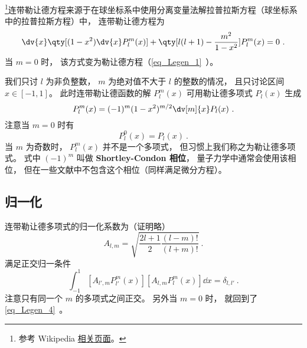 

\footnote{参考 Wikipedia \href{https://en.wikipedia.org/wiki/Associated_Legendre_polynomials}{相关页面}。}连带勒让德方程来源于在球坐标系中使用分离变量法解拉普拉斯方程（球坐标系中的拉普拉斯方程）中， 连带勒让德方程为
\begin{equation}
\dv{x} \qty[(1-x^2)\dv{x} P_l^m(x)] + \qty[l(l+1) - \frac{m^2}{1-x^2}]P_l^m(x) = 0~.
\end{equation}
当 $m = 0$ 时， 该方式变为勒让德方程（\autoref{eq_Legen_1}~）。

我们只讨 $l$ 为非负整数， $m$ 为绝对值不大于 $l$ 的整数的情况， 且只讨论区间 $x\in [-1,1]$。 此时连带勒让德函数的解 $P_l^m(x)$ 可用勒让德多项式 $P_l(x)$ 生成
\begin{equation}\label{eq_AsLgdr_1}
P_l^m(x) = (-1)^m (1 - x^2)^{m/2} \dv[m]{x} P_l(x)~.
\end{equation}
注意当 $m = 0$ 时有
\begin{equation}
P_l^0(x) = P_l(x)~.
\end{equation}
当 $m$ 为奇数时， $P_l^m(x)$ 并不是一个多项式， 但习惯上我们称之为勒让德多项式。 式中 $(-1)^m$ 叫做 \textbf{Shortley-Condon 相位}， 量子力学中通常会使用该相位， 但在一些文献中不包含这个相位（同样满足微分方程）。

\subsection{归一化}
连带勒让德多项式的归一化系数为（证明略）
\begin{equation}\label{eq_AsLgdr_3}
A_{l,m} = \sqrt{\frac{2l+1}{2}\frac{(l-m)!}{(l+m)!}}~.
\end{equation}
满足正交归一条件
\begin{equation}\label{eq_AsLgdr_4}
\int_{-1}^1 [A_{l',m} P_{l'}^{m}(x)] [A_{l,m} P_l^{m}(x)] \dd{x} = \delta_{l,l'}~.
\end{equation}
注意只有同一个 $m$ 的多项式之间正交。 另外当 $m = 0$ 时， 就回到了\autoref{eq_Legen_4}~。


